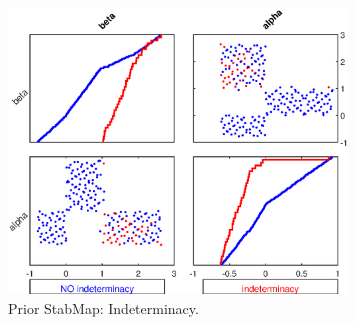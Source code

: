 
\begin{figure}[H]
\centering 
\includegraphics[width=0.8\textwidth]{RBC_kz/gsa/RBC_kz_prior_indeterm}
\caption{Prior StabMap: Indeterminacy.}\label{Fig:RBC_kz_prior_indeterm}
\end{figure}

